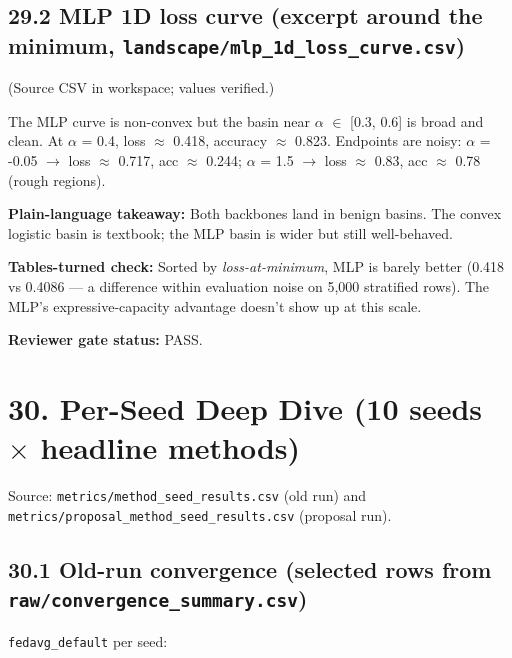 \documentclass{article}
\begin{document}
\subsection{29.2 MLP 1D loss curve (excerpt around the minimum, \texttt{landscape/mlp\_1d\_loss\_curve.csv})}


(Source CSV in workspace; values verified.)


The MLP curve is non-convex but the basin near \ensuremath{\alpha} \ensuremath{\in} [0.3, 0.6] is broad and clean. At \ensuremath{\alpha} = 0.4, loss \ensuremath{\approx} 0.418, accuracy \ensuremath{\approx} 0.823. Endpoints are noisy: \ensuremath{\alpha} = -0.05 \ensuremath{\rightarrow} loss \ensuremath{\approx} 0.717, acc \ensuremath{\approx} 0.244; \ensuremath{\alpha} = 1.5 \ensuremath{\rightarrow} loss \ensuremath{\approx} 0.83, acc \ensuremath{\approx} 0.78 (rough regions).


\textbf{Plain-language takeaway:} Both backbones land in benign basins. The convex logistic basin is textbook; the MLP basin is wider but still well-behaved.


\textbf{Tables-turned check:} Sorted by \emph{loss-at-minimum}, MLP is barely better (0.418 vs 0.4086 --- a difference within evaluation noise on 5,000 stratified rows). The MLP's expressive-capacity advantage doesn't show up at this scale.


\textbf{Reviewer gate status:} PASS.



\clearpage
\section{30. Per-Seed Deep Dive (10 seeds \ensuremath{\times} headline methods)}


Source: \texttt{metrics/method\_seed\_results.csv} (old run) and \texttt{metrics/proposal\_method\_seed\_results.csv} (proposal run).


\subsection{30.1 Old-run convergence (selected rows from \texttt{raw/convergence\_summary.csv})}


\texttt{fedavg\_default} per seed:
\end{document}

